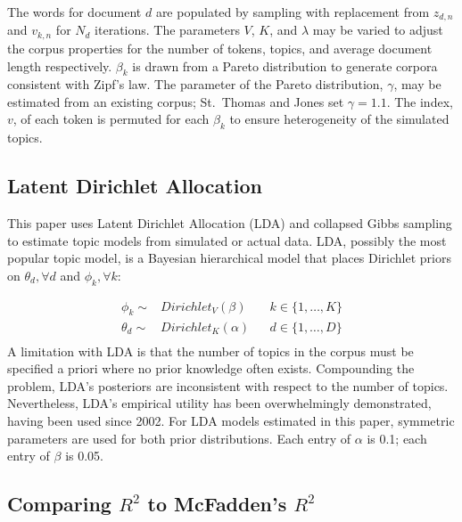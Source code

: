 \documentclass[conference,final,]{IEEEtran}
\begin{document}
The words for document \(d\) are populated by sampling with replacement
from \(z_{d,n}\) and \(v_{k,n}\) for \(N_d\) iterations. The parameters
\(V\), \(K\), and \(\lambda\) may be varied to adjust the corpus
properties for the number of tokens, topics, and average document length
respectively. \(\beta_k\) is drawn from a Pareto distribution to
generate corpora consistent with Zipf's law. The parameter of the Pareto
distribution, \(\gamma\), may be estimated from an existing corpus;
St.~Thomas and Jones set \(\gamma = 1.1\). The index, \(v\), of each
token is permuted for each \(\beta_k\) to ensure heterogeneity of the
simulated topics.

\hypertarget{latent-dirichlet-allocation}{%
\subsection{Latent Dirichlet
Allocation}\label{latent-dirichlet-allocation}}

This paper uses Latent Dirichlet Allocation (LDA) and collapsed Gibbs
sampling to estimate topic models from simulated or actual data. LDA,
possibly the most popular topic model, is a Bayesian hierarchical model
that places Dirichlet priors on \(\theta_d, \forall d\) and
\(\phi_k, \forall k\):

\begin{align*}
\phi_k \sim& Dirichlet_V(\beta) && k\in\{1, \ldots, K\} \\
{\theta}_d \sim& Dirichlet_K({\alpha}) && d\in\{1, \ldots, D\}\\
\end{align*} A limitation with LDA is that the number of topics in the
corpus must be specified a priori where no prior knowledge often exists.
Compounding the problem, LDA's posteriors are inconsistent with respect
to the number of topics. \cite{womack13} Nevertheless, LDA's empirical
utility has been overwhelmingly demonstrated, having been used since
2002. For LDA models estimated in this paper, symmetric parameters are
used for both prior distributions. Each entry of \(\alpha\) is 0.1; each
entry of \(\beta\) is 0.05.

\subsection{Comparing $R^2$ to McFadden's $R^2$}
\end{document}
